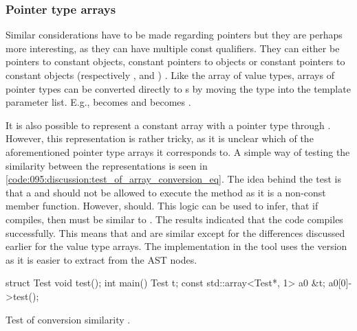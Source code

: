 \subsubsection*{Pointer type arrays}
Similar considerations have to be made regarding pointers but they are perhaps more interesting, as they can have multiple const qualifiers.
They can either be pointers to constant objects, constant pointers to objects or constant pointers to constant objects (respectively ,  and ) \cite{cppreferencePointerDeclarationCppreference}.
Like the array of value types, arrays of pointer types can be converted directly to s by moving the type into the template parameter list.
E.g.,  becomes  and  becomes .

It is also possible to represent a constant array with a pointer type through .
However, this representation is rather tricky, as it is unclear which of the aforementioned pointer type arrays it corresponds to.
A simple way of testing the similarity between the representations is seen in \cref{code:095:discussion:test_of_array_conversion_eq}.
The idea behind the test is that a  and  should not be allowed to execute the  method as it is a non-const member function. However,  should.
This logic can be used to infer, that if  compiles, then  must be similar to .
The results indicated that the code compiles successfully.
This means that  and  are similar except for the differences discussed earlier for the value type arrays. The implementation in the tool uses the  version as it is easier to extract from the AST nodes.


\begin{listing}[H]
    \begin{cppcode}
struct Test {void test(){}};
int main() {
    Test t;
    const std::array<Test*, 1> a0 {&t};
    a0[0]->test();
}
    \end{cppcode}
    \caption{Test of conversion similarity
    .}
    \label{code:095:discussion:test_of_array_conversion_eq}
\end{listing}


